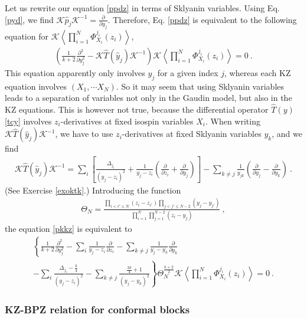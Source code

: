 \documentclass[12pt, a4paper, notitlepage, twoside]{report}
\numberwithin{equation}{section}
\theoremstyle{break}
\begin{document}
Let us rewrite our equation \eqref{ppdz} in terms of Sklyanin variables.
Using Eq. \eqref{pyd}, we find
$\mathcal{K} \hat{p}_j \mathcal{K}^{-1}= {\frac{\partial}{\partial y_j}} $.
Therefore,  
Eq. \eqref{ppdz} is equivalent to the following equation for $\mathcal{K}\left\langle \prod_{i=1}^N \Phi^{j_i}_{X_i}(z_i)\right\rangle$,
\begin{align}
 \left(\frac{1}{k+2}\frac{\partial ^2}{\partial y_j^2} - \mathcal{K} \hat{T}(\hat{y}_j) \mathcal{K}^{-1}\right)\mathcal{K}\left\langle \prod_{i=1}^N \Phi^{j_i}_{X_i}(z_i)\right\rangle  = 0\ .
\label{pkkz}
\end{align}
This equation apparently only involves $y_j$ for a given index $j$, whereas each KZ equation involves $(X_1,\cdots X_N)$. 
So it may seem that using Sklyanin variables leads to a separation of variables not only in the Gaudin model, but also
in the KZ equations. 
This is however not true, because the differential operator $\hat{T}(y)$ \eqref{tcy} involves $z_i$-derivatives at fixed isospin variables $X_i$.
When writing $\mathcal{K} \hat{T}(\hat{y}_j) \mathcal{K}^{-1}$, we have to use $z_i$-derivatives at fixed Sklyanin variables $y_k$, and we find
\begin{align}
\mathcal{K} \hat{T}(\hat{y}_j) \mathcal{K}^{-1} = \sum_i\left[\frac{\Delta_{j_i}}{(y_j-z_i)^2}+ \frac{1}{y_j-z_i}\left({\frac{\partial}{\partial z_i}}+{\frac{\partial}{\partial y_j}}\right)\right]-\sum_{k\neq j}\frac{1}{y_{jk}}\left({\frac{\partial}{\partial y_j}}-{\frac{\partial}{\partial y_k}}\right)\ .
\label{dtyj}
\end{align}
(See Exercise \ref{exoktk}.) 
Introducing the function
\begin{align}
 \Theta_N = \frac{\prod_{i<i'\leq N}(z_i-z_{i'})\prod_{j<j'\leq N-2}(y_j-y_{j'})}{\prod_{i=1}^N\prod_{j=1}^{N-2}(z_i-y_j)}\ ,
\end{align}
the equation \eqref{pkkz} is equivalent to 
\begin{multline}
 \left\{\frac{1}{k+2}  \frac{\partial^2}{\partial y_j^2} - \sum_i\frac{1}{y_j-z_i}{\frac{\partial}{\partial z_i}} -\sum_{k\neq j}\frac{1}{y_j-y_k} {\frac{\partial}{\partial y_k}}
\right. \\ \left.
 -\sum_i\frac{\Delta_{j_i}-\frac{k}{4}}{(y_j-z_i)^2}  -\sum_{k\neq j}\frac{\frac{3k}{4}+1}{(y_j-y_k)^2}   \right\} \Theta_N^{\frac{k+2}{2}}\mathcal{K}\left\langle \prod_{i=1}^N \Phi^{j_i}_{X_i}(z_i)\right\rangle = 0\ .
 \label{vskz}
\end{multline}

\subsubsection{KZ-BPZ relation for conformal blocks}
\end{document}
